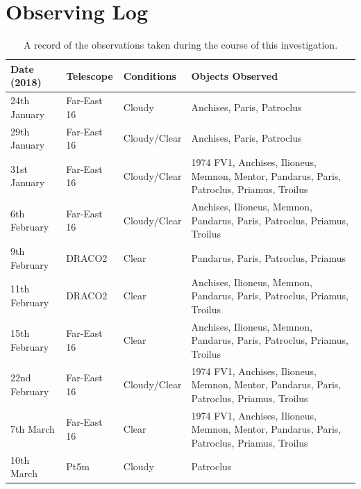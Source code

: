 \documentclass[10pt, twocolumn]{revtex4}    %
\begin{document}

\vspace{1ex}
%
%
%
\normalem

\clearpage
\appendix

\section{Observing Log}

\begin{table}[h!]
\centering
\begin{tabularx}{0.5\textwidth}{ Y Y Y Y }
\hhline{====}

Date (2018) & Telescope & Conditions & Objects Observed \\ \hline 
24th January & Far-East 16 & Cloudy & Anchises, Paris, Patroclus \\ \hline

29th January & Far-East 16 & Cloudy/Clear & Anchises, Paris, Patroclus \\ \hline

31st January & Far-East 16 & Cloudy/Clear & 1974 FV1, Anchises, Ilioneus, Memnon, Mentor, Pandarus, Paris, Patroclus, Priamus, Troilus \\ \hline

6th February & Far-East 16 & Cloudy/Clear & Anchises, Ilioneus, Memnon, Pandarus, Paris, Patroclus, Priamus, Troilus \\ \hline

9th February & DRACO2 & Clear & Pandarus, Paris, Patroclus, Priamus \\ \hline

11th February & DRACO2 & Clear & Anchises, Ilioneus, Memnon, Pandarus, Paris, Patroclus, Priamus, Troilus \\ \hline

15th February & Far-East 16 & Clear & Anchises, Ilioneus, Memnon, Pandarus, Paris, Patroclus, Priamus, Troilus \\ \hline

22nd February & Far-East 16 & Cloudy/Clear & 1974 FV1, Anchises, Ilioneus, Memnon, Mentor, Pandarus, Paris, Patroclus, Priamus, Troilus \\ \hline

7th March & Far-East 16 & Clear & 1974 FV1, Anchises, Ilioneus, Memnon, Mentor, Pandarus, Paris, Patroclus, Priamus, Troilus \\ \hline

10th March & Pt5m & Cloudy & Patroclus \\ \hline

\end{tabularx}
\caption{A record of the observations taken during the course of this investigation.}
\label{tab: observing log}
\end{table} 
\end{document}
